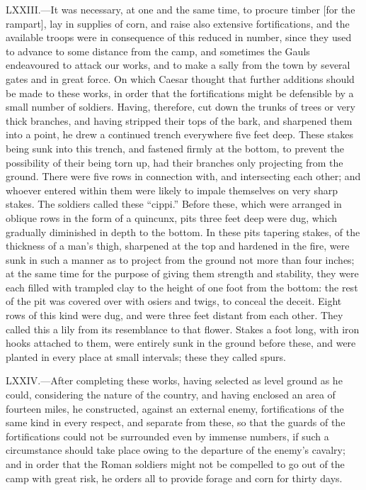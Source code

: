 LXXIII.—It was necessary, at one and the same time, to procure timber
[for the rampart], lay in supplies of corn, and raise also extensive
fortifications, and the available troops were in consequence of this
reduced in number, since they used to advance to some distance from the
camp, and sometimes the Gauls endeavoured to attack our works, and to
make a sally from the town by several gates and in great force. On which
Caesar thought that further additions should be made to these works, in
order that the fortifications might be defensible by a small number of
soldiers. Having, therefore, cut down the trunks of trees or very thick
branches, and having stripped their tops of the bark, and sharpened them
into a point, he drew a continued trench everywhere five feet deep.
These stakes being sunk into this trench, and fastened firmly at the
bottom, to prevent the possibility of their being torn up, had their
branches only projecting from the ground. There were five rows in
connection with, and intersecting each other; and whoever entered within
them were likely to impale themselves on very sharp stakes. The soldiers
called these ``cippi.'' Before these, which were arranged in oblique rows
in the form of a quincunx, pits three feet deep were dug, which
gradually diminished in depth to the bottom. In these pits tapering
stakes, of the thickness of a man's thigh, sharpened at the top and
hardened in the fire, were sunk in such a manner as to project from the
ground not more than four inches; at the same time for the purpose of
giving them strength and stability, they were each filled with trampled
clay to the height of one foot from the bottom: the rest of the pit was
covered over with osiers and twigs, to conceal the deceit. Eight rows of
this kind were dug, and were three feet distant from each other. They
called this a lily from its resemblance to that flower. Stakes a foot
long, with iron hooks attached to them, were entirely sunk in the ground
before these, and were planted in every place at small intervals; these
they called spurs.

LXXIV.—After completing these works, having selected as level ground as
he could, considering the nature of the country, and having enclosed an
area of fourteen miles, he constructed, against an external enemy,
fortifications of the same kind in every respect, and separate from
these, so that the guards of the fortifications could not be surrounded
even by immense numbers, if such a circumstance should take place owing
to the departure of the enemy's cavalry; and in order that the Roman
soldiers might not be compelled to go out of the camp with great risk,
he orders all to provide forage and corn for thirty days.

